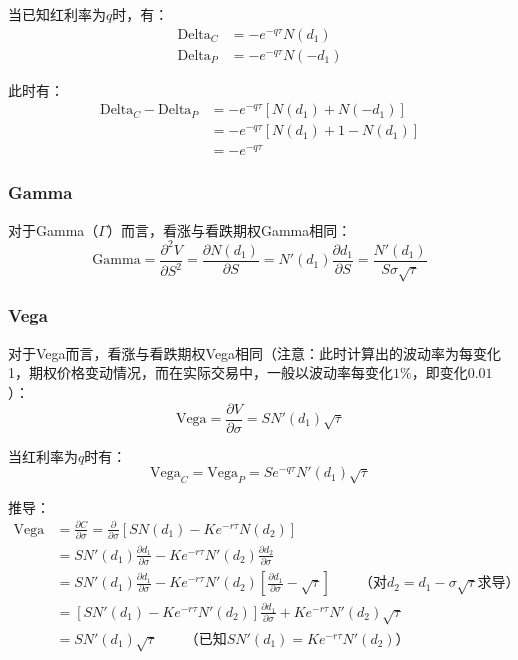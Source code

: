 \documentclass[11pt]{article}
\begin{document}
当已知红利率为$q$时，有：
\begin{align*}
    \text{Delta}_C &= -e^{-q\tau} N(d_1) \\
    \text{Delta}_P &= -e^{-q\tau} N(-d_1)
\end{align*}

此时有：
\begin{align*}
    \text{Delta}_C - \text{Delta}_P 
    &= -e^{-q\tau} \left[ N(d_1) + N(-d_1) \right] \\
    &= -e^{-q\tau} \left[ N(d_1) + 1 - N(d_1) \right] \\
    &= -e^{-q\tau}
\end{align*}

\subsubsection{Gamma}

对于Gamma（$\Gamma$）而言，看涨与看跌期权Gamma相同：
\begin{equation*}
    \text{Gamma} = \frac{\partial^2 V}{\partial S^2} = \frac{\partial N(d_1)}{\partial S} = N'(d_1)\frac{\partial d_1}{\partial S} = \frac{N'(d_1)}{S\sigma\sqrt{\tau}}
\end{equation*}

\subsubsection{Vega}

对于Vega而言，看涨与看跌期权Vega相同（注意：此时计算出的波动率为每变化1，期权价格变动情况，而在实际交易中，一般以波动率每变化$1\%$，即变化$0.01$）：
\begin{equation*}
    \text{Vega} = \frac{\partial V}{\partial \sigma}  = SN'(d_1)\sqrt{\tau}
\end{equation*}

当红利率为$q$时有：
\begin{equation*}
    \text{Vega}_C = \text{Vega}_P = S e^{-q\tau}N'(d_1)\sqrt{\tau}
\end{equation*}

推导：
\begin{align*}
    \text{Vega} &= \frac{\partial C}{\partial \sigma} = \frac{\partial}{\partial \sigma} \left[S N(d_1) - K e^{-r\tau}N(d_2)\right] \\
    &= S N'(d_1) \frac{\partial d_1}{\partial \sigma} - Ke^{-r\tau}N'(d_2) \frac{\partial d_2}{\partial \sigma} \\
    &= S N'(d_1) \frac{\partial d_1}{\partial \sigma} - Ke^{-r\tau}N'(d_2) \left[ \frac{\partial d_1}{\partial \sigma} -\sqrt{\tau} \right] \qquad \text{（对$d_2 = d_1 - \sigma\sqrt{\tau}$求导）} \\
    &= \left[ S N'(d_1) - Ke^{-r\tau}N'(d_2) \right] \frac{\partial d_1}{\partial \sigma} + Ke^{-r\tau}N'(d_2) \sqrt{\tau} \\
    &= S N'(d_1)\sqrt{\tau} \qquad \text{（已知$S N'(d_1) = Ke^{-r\tau}N'(d_2)$）}
\end{align*}
\end{document}
